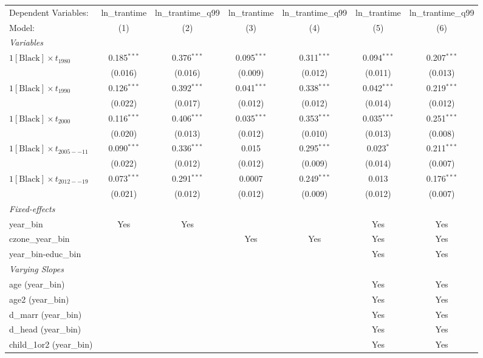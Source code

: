 \begin{tabular}{lcccccc}
\tabularnewline\midrule\midrule
Dependent Variables:&ln\_trantime&ln\_trantime\_q99&ln\_trantime&ln\_trantime\_q99&ln\_trantime&ln\_trantime\_q99\\
Model:&(1) & (2) & (3) & (4) & (5) & (6)\\
\midrule \emph{Variables}&   &   &   &   &   &  \\
$1[\text{Black}] \times t_{1980}$ & 0.185$^{***}$ & 0.376$^{***}$ & 0.095$^{***}$ & 0.311$^{***}$ & 0.094$^{***}$ & 0.207$^{***}$\\
  &(0.016) & (0.016) & (0.009) & (0.012) & (0.011) & (0.013)\\
$1[\text{Black}] \times t_{1990}$ & 0.126$^{***}$ & 0.392$^{***}$ & 0.041$^{***}$ & 0.338$^{***}$ & 0.042$^{***}$ & 0.219$^{***}$\\
  &(0.022) & (0.017) & (0.012) & (0.012) & (0.014) & (0.012)\\
$1[\text{Black}] \times t_{2000}$ & 0.116$^{***}$ & 0.406$^{***}$ & 0.035$^{***}$ & 0.353$^{***}$ & 0.035$^{***}$ & 0.251$^{***}$\\
  &(0.020) & (0.013) & (0.012) & (0.010) & (0.013) & (0.008)\\
$1[\text{Black}] \times t_{2005--11}$ & 0.090$^{***}$ & 0.336$^{***}$ & 0.015 & 0.295$^{***}$ & 0.023$^{*}$ & 0.211$^{***}$\\
  &(0.022) & (0.012) & (0.012) & (0.009) & (0.014) & (0.007)\\
$1[\text{Black}] \times t_{2012--19}$ & 0.073$^{***}$ & 0.291$^{***}$ & 0.0007 & 0.249$^{***}$ & 0.013 & 0.176$^{***}$\\
  &(0.021) & (0.012) & (0.012) & (0.009) & (0.012) & (0.007)\\
\midrule \emph{Fixed-effects}&   &   &   &   &   &  \\
year\_bin & Yes & Yes &  &  & Yes & Yes\\
czone\_year\_bin &  &  & Yes & Yes & Yes & Yes\\
year\_bin-educ\_bin &  &  &  &  & Yes & Yes\\
\midrule \emph{Varying Slopes}&   &   &   &   &   &  \\
age (year\_bin) &  &  &  &  & Yes & Yes\\
age2 (year\_bin) &  &  &  &  & Yes & Yes\\
d\_marr (year\_bin) &  &  &  &  & Yes & Yes\\
d\_head (year\_bin) &  &  &  &  & Yes & Yes\\
child\_1or2 (year\_bin) &  &  &  &  & Yes & Yes\\

\end{tabular}
